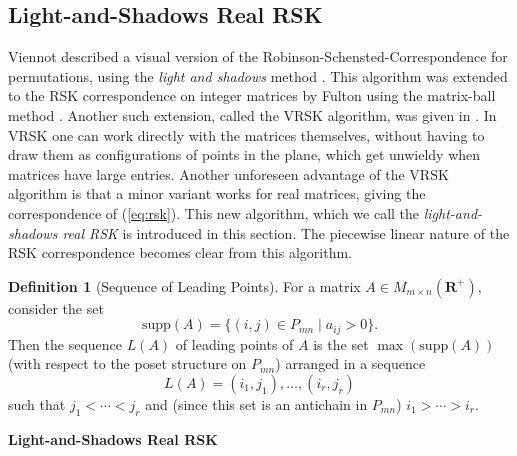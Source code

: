 \documentclass[10pt]{amsproc}
\theoremstyle{definition}
\newtheorem{definition}[theorem]{Definition}
\theoremstyle{remark}
\newcommand{\rp}{\mathbf{R}^+}
\newcommand{\supp}{\mathrm{supp}}
\begin{document}
\subsection{Light-and-Shadows Real RSK}
\label{sec:light-and-shadows-rsk}
Viennot described a visual version of the Robinson-Schensted-Correspondence for permutations, using the \emph{light and shadows} method \cite{viennot1977forme}.
This algorithm was extended to the RSK correspondence on integer matrices by Fulton using the matrix-ball method \cite{fulton}.
Another such extension, called the VRSK algorithm, was given in \cite[Chapter~3]{rtcv}.
In VRSK one can work directly with the matrices themselves, without having to draw them as configurations of points in the plane, which get unwieldy when matrices have large entries.
Another unforeseen advantage of the VRSK algorithm is that a minor variant works for real matrices, giving the correspondence of (\ref{eq:rsk}).
This new algorithm, which we call the \emph{light-and-shadows real RSK} is introduced in this section.
The piecewise linear nature of the RSK correspondence becomes clear from this algorithm.
\begin{definition}
  [Sequence of Leading Points]
  For a matrix $A\in M_{m\times n}(\rp)$, consider the set
  \begin{displaymath}
    \supp(A) = \{(i,j)\in P_{mn}\mid a_{ij}>0\}.
  \end{displaymath}
  Then the sequence $L(A)$ of leading points of $A$ is the set $\max(\supp(A))$ (with respect to the poset structure on $P_{mn}$) arranged in a sequence
  \begin{displaymath}
    L(A) = (i_1,j_1),\dotsc,(i_r,j_r)
  \end{displaymath}
  such that $j_1<\dotsb <j_r$ and (since this set is an antichain in $P_{mn}$) $i_1>\dotsb >i_r$.
\end{definition}
\begin{center}
  \textbf{Light-and-Shadows Real RSK}
\end{center}
\end{document}
